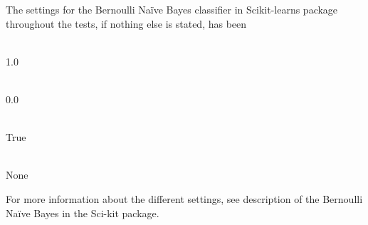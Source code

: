 The settings for the Bernoulli Naïve Bayes classifier in Scikit-learns package throughout the tests, if nothing else is stated, has been
\begin{description}
	\item[Alpha] \ \\1.0
	\item[Binarize] \ \\0.0
	\item[Fit prior]\ \\ True
	\item[Class prior] \ \\None
\end{description}
For more information about the different settings, see description of the Bernoulli Naïve Bayes in the Sci-kit package.